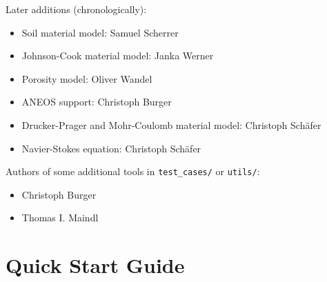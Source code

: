 \documentclass[10pt,fleqn,twoside]{article}
\begin{document}
Later additions (chronologically):
\begin{itemize}
\item Soil material model: Samuel Scherrer
\item Johnson-Cook material model: Janka Werner
\item Porosity model: Oliver Wandel
\item ANEOS support: Christoph Burger
\item Drucker-Prager and Mohr-Coulomb material model: Christoph Schäfer
\item Navier-Stokes equation: Christoph Schäfer
\end{itemize}

Authors of some additional tools in \verb|test_cases/| or \verb|utils/|:
\begin{itemize}
\item Christoph Burger
\item Thomas I. Maindl
\end{itemize}







\section{Quick Start Guide}
\end{document}
